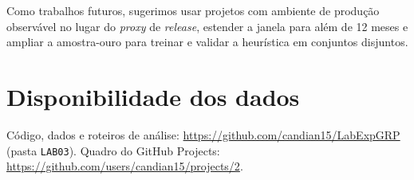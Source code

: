 \documentclass[12pt]{article}
\begin{document}
Como trabalhos futuros, sugerimos usar projetos com ambiente de produção observável no lugar
do \textit{proxy} de \textit{release}, estender a janela para além de 12 meses e ampliar a
amostra-ouro para treinar e validar a heurística em conjuntos disjuntos.

\section*{Disponibilidade dos dados}

Código, dados e roteiros de análise: \url{https://github.com/candian15/LabExpGRP} (pasta
\texttt{LAB03}). Quadro do GitHub Projects:
\url{https://github.com/users/candian15/projects/2}.



\end{document}
